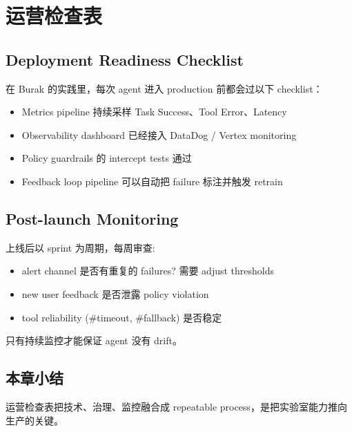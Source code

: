 \section{运营检查表}

\subsection{Deployment Readiness Checklist}

在 Burak 的实践里，每次 agent 进入 production 前都会过以下 checklist：

\begin{itemize}
    \item Metrics pipeline 持续采样 Task Success、Tool Error、Latency
    \item Observability dashboard 已经接入 DataDog / Vertex monitoring
    \item Policy guardrails 的 intercept tests 通过
    \item Feedback loop pipeline 可以自动把 failure 标注并触发 retrain
\end{itemize}

\subsection{Post-launch Monitoring}

上线后以 sprint 为周期，每周审查:

\begin{itemize}
    \item alert channel 是否有重复的 failures? 需要 adjust thresholds
    \item new user feedback 是否泄露 policy violation
    \item tool reliability (\#timeout, \#fallback) 是否稳定
\end{itemize}

只有持续监控才能保证 agent 没有 drift。

\subsection{本章小结}

运营检查表把技术、治理、监控融合成 repeatable process，是把实验室能力推向生产的关键。

